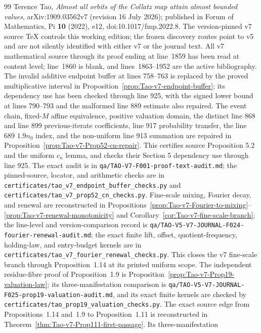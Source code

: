 \begin{thebibliography}{99}
Terence Tao,
\emph{Almost all orbits of the Collatz map attain almost bounded values},
arXiv:1909.03562v7 (revision 16 July 2026); published in Forum of Mathematics,
Pi \textbf{10} (2022), e12, doi:10.1017/fmp.2022.8.  The version-pinned v7
source TeX controls this working edition; the frozen discovery routes point
to v5 and are not silently identified with either v7 or the journal text.
All v7 mathematical source through its proof ending at line~1859 has been
read at content level; line~1860 is blank, and lines~1863--1952 are the
active bibliography.  The invalid additive
endpoint buffer at lines 758--763 is replaced by the proved multiplicative
interval in Proposition~\ref{prop:Tao-v7-endpoint-buffer}; its dependency use
has been checked through line 925, with the signed lower bound at
lines 790--793 and the malformed line 889 estimate also repaired.  The event
chain, fixed-\(M\) affine equivalence, positive valuation domain, the distinct
line 868 and line 899 previous-iterate coefficients, line 917 probability
transfer, the line 689 \(1.9n_0\) index, and the non-uniform line 913
summation are repaired in
Proposition~\ref{prop:Tao-v7-Prop52-cn-repair}.  This certifies source
Proposition 5.2 and the uniform \(c_n\) lemma, and checks their Section 5
dependency use through line 925.  The exact audit is in
\texttt{qa/TAO-V7-F001-proof-text-audit.md}; the pinned-source, locator, and
arithmetic checks are in
\texttt{certificates/tao\_v7\_endpoint\_buffer\_checks.py} and
\texttt{certificates/tao\_v7\_prop52\_cn\_checks.py}.  Fine-scale mixing,
Fourier decay, and renewal are reconstructed in
Propositions~\ref{prop:Tao-v7-Fourier-to-mixing}--
\ref{prop:Tao-v7-renewal-monotonicity} and
Corollary~\ref{cor:Tao-v7-fine-scale-branch}; the line-level and
version-comparison record is
\texttt{qa/TAO-V5-V7-JOURNAL-F024-fourier-renewal-audit.md}; the exact finite
lift, offset, quotient-frequency, holding-law, and entry-budget kernels are in
\texttt{certificates/tao\_v7\_fourier\_renewal\_checks.py}.  This closes the
v7 fine-scale branch through Proposition~1.14 at its printed uniform scope.
The independent residue-fibre proof of Proposition~1.9 is
Proposition~\ref{prop:Tao-v7-Prop19-valuation-law}; its three-manifestation
comparison is
\texttt{qa/TAO-V5-V7-JOURNAL-F025-prop19-valuation-audit.md}, and its exact
finite kernels are checked by
\texttt{certificates/tao\_prop19\_valuation\_checks.py}.  The exact source
edge from Propositions~1.14 and~1.9 to Proposition~1.11 is reconstructed in
Theorem~\ref{thm:Tao-v7-Prop111-first-passage}.  Its three-manifestation

\end{thebibliography}
